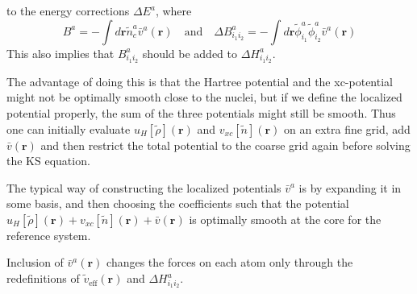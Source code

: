 \documentclass[a4paper]{article}
\newcommand{\s}[1]{\tilde{#1}}
\newcommand{\br}{\mathbf{r}}
\begin{document}
%
to the energy corrections $\Delta E^a$, where
%
\begin{equation}
  B^a = -\int d\br \s{n}_c^a\bar{v}^a(\br) \quad\text{and}\quad \Delta B^a_{i_1i_2} = -\int d\br \s{\phi}^a_{i_1}\s{\phi}^a_{i_2}\bar{v}^a(\br)
\end{equation}
%
This also implies that $B^a_{i_1i_2}$ should be added to $\Delta
H^a_{i_1i_2}$.
\par The advantage of doing this is that the Hartree potential and the
xc-potential might not be optimally smooth close to the nuclei, but if
we define the localized potential properly, the sum of the three
potentials might still be smooth. Thus one can initially evaluate
$u_H[\s{\rho}](\br)$ and $v_{xc}[\s{n}](\br)$ on an extra fine grid,
add $\bar{v}(\br)$ and then restrict the total potential to the coarse
grid again before solving the KS equation.
\par The typical way of constructing the localized potentials
$\bar{v}^a$ is by expanding it in some basis, and then choosing the
coefficients such that the potential $u_H[\s{\rho}](\br) +
v_{xc}[\s{n}](\br) + \bar{v}(\br)$ is optimally smooth at the core for
the reference system.
\par Inclusion of $\bar{v}^a(\br)$ changes the forces on each atom
only through the redefinitions of $\s{v}_\text{eff}(\br)$ and $\Delta
H^a_{i_1i_2}$.
\end{document}
